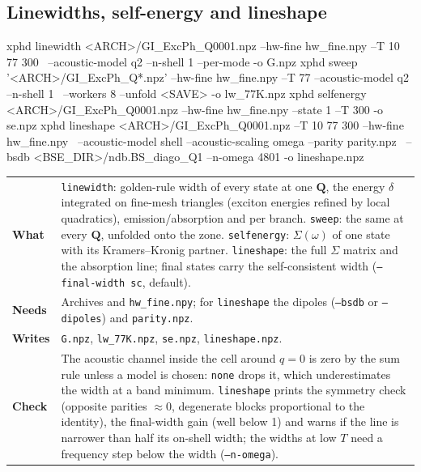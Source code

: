 \documentclass[10pt,a4paper]{article}
\makeatletter
\newcommand{\bQ}{\mathbf{Q}}
\newcommand{\step}[4]{%
  {\small\noindent\begin{tabularx}{\linewidth}{@{}>{\bfseries\leavevmode\color{accent}}p{2.0cm}X@{}}
  What & #1\\ Needs & #2\\ Writes & #3\\ Check & #4\end{tabularx}\par}\vspace{1.0ex}}
\makeatother
\begin{document}
\subsection{Linewidths, self-energy and lineshape}
\begin{cmd}
xphd linewidth <ARCH>/GI_ExcPh_Q0001.npz --hw-fine hw_fine.npy --T 10 77 300 \
      --acoustic-model q2 --n-shell 1 --per-mode -o G.npz
xphd sweep '<ARCH>/GI_ExcPh_Q*.npz' --hw-fine hw_fine.npy --T 77 --acoustic-model q2 --n-shell 1 \
      --workers 8 --unfold <SAVE> -o lw_77K.npz
xphd selfenergy <ARCH>/GI_ExcPh_Q0001.npz --hw-fine hw_fine.npy --state 1 --T 300 -o se.npz
xphd lineshape <ARCH>/GI_ExcPh_Q0001.npz --T 10 77 300 --hw-fine hw_fine.npy \
      --acoustic-model shell --acoustic-scaling omega --parity parity.npz \
      --bsdb <BSE_DIR>/ndb.BS_diago_Q1 --n-omega 4801 -o lineshape.npz
\end{cmd}
\step{\texttt{linewidth}: golden-rule width of every state at one $\bQ$, the energy $\delta$ integrated on fine-mesh triangles
(exciton energies refined by local quadratics), emission/absorption and per branch. \texttt{sweep}: the same at every $\bQ$, unfolded
onto the zone. \texttt{selfenergy}: $\Sigma(\omega)$ of one state with its Kramers--Kronig partner. \texttt{lineshape}: the full
$\Sigma$ matrix and the absorption line; final states carry the self-consistent width (\texttt{--final-width sc}, default).}
{Archives and \texttt{hw\_fine.npy}; for \texttt{lineshape} the dipoles (\texttt{--bsdb} or \texttt{--dipoles}) and \texttt{parity.npz}.}
{\texttt{G.npz}, \texttt{lw\_77K.npz}, \texttt{se.npz}, \texttt{lineshape.npz}.}
{The acoustic channel inside the cell around $q=0$ is zero by the sum rule unless a model is chosen: \texttt{none} drops it, which
underestimates the width at a band minimum. \texttt{lineshape} prints the symmetry check (opposite parities $\approx0$, degenerate blocks
proportional to the identity), the final-width gain (well below 1) and warns if the line is narrower than half its on-shell width; the widths
at low $T$ need a frequency step below the width (\texttt{--n-omega}).}
\end{document}
